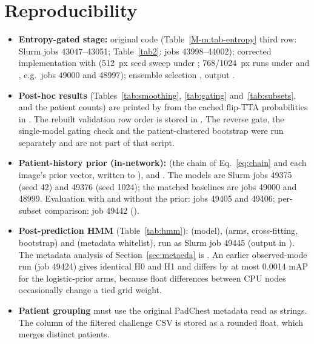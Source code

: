 \documentclass[conference]{IEEEtran}
\begin{document}
\section{Reproducibility}
\label{s:repro}
\begin{itemize}
\item \textbf{Entropy-gated stage:} original code  (Table~\ref{M-m:tab-entropy} third row: Slurm jobs 43047--43051; Table~\ref{tab2}: jobs 43998--44002); corrected implementation  with  (512~px seed sweep under ; 768/1024~px runs under  and , e.g.\ jobs 49000 and 48997); ensemble selection , output .
\item \textbf{Post-hoc results} (Tables~\ref{tab:smoothing}, \ref{tab:gating} and~\ref{tab:subsets}, and the patient counts) are printed by  from the cached flip-TTA probabilities in . The rebuilt validation row order is stored in . The reverse gate, the single-model gating check and the patient-clustered bootstrap were run separately and are not part of that script.
\item \textbf{Patient-history prior (in-network):}  (the chain of Eq.~\eqref{eq:chain} and each image's prior vector, written to ),  and . The models are Slurm jobs 49375 (seed 42) and 49376 (seed 1024); the matched baselines are jobs 49000 and 48999. Evaluation with and without the prior: jobs 49405 and 49406; per-subset comparison: job 49442 ().
\item \textbf{Post-prediction HMM} (Table~\ref{tab:hmm}):  (model),  (arms, cross-fitting, bootstrap) and  (metadata whitelist), run as Slurm job 49445 (output in ). The metadata analysis of Section~\ref{sec:metaeda} is . An earlier observed-mode run (job 49424) gives identical H0 and H1 and differs by at most 0.0014 mAP for the logistic-prior arms, because float differences between CPU nodes occasionally change a tied grid weight.
\item \textbf{Patient grouping} must use the original PadChest metadata read as strings. The  column of the filtered challenge CSV is stored as a rounded float, which merges distinct patients.
\end{itemize}
\end{document}
